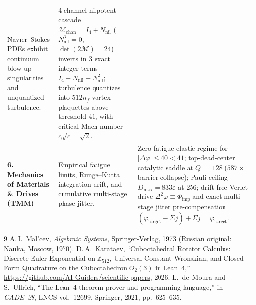\documentclass[11pt,a4paper]{article}
\theoremstyle{definition}
\theoremstyle{remark}
\begin{document}
\begin{table}[htbp]
\begin{tabular}{@{}p{}p{}p{}@{}}
Navier--Stokes PDEs exhibit continuum blow-up singularities and unquantized turbulence. &
$4$-channel nilpotent cascade $\mathcal{M}_{\mathrm{chan}} = I_4 + N_{\mathrm{nil}}$ ($N_{\mathrm{nil}}^3=0$, $\det(2\mathcal{M})=24$) inverts in 3 exact integer terms $I_4 - N_{\mathrm{nil}} + N_{\mathrm{nil}}^2$; turbulence quantizes into $512 n_f$ vortex plaquettes above threshold $41$, with critical Mach number $c_0/c=\sqrt{2}$. \\
\addlinespace[3pt]
\textbf{6. Mechanics of Materials \& Drives (TMM)} &
Empirical fatigue limits, Runge--Kutta integration drift, and cumulative multi-stage phase jitter. &
Zero-fatigue elastic regime for $|\Delta\varphi|\le 40 < 41$; top-dead-center catalytic saddle at $Q_\square=128$ ($587\times$ barrier collapse); Pauli ceiling $D_{\max}=833\varepsilon$ at $256$; drift-free Verlet drive $\Delta^2\varphi\equiv\Phi_{\mathrm{imp}}$ and exact multi-stage jitter pre-compensation $(\varphi_{\mathrm{target}}-\Sigma j)+\Sigma j = \varphi_{\mathrm{target}}$. \\
\bottomrule
\end{tabular}
\end{table}

\begin{thebibliography}{9}
A.\,I.~Mal'cev, \emph{Algebraic Systems}, Springer-Verlag, 1973 (Russian original: Nauka, Moscow, 1970).
D.\,A.~Karataev, ``Cuboctahedral Rotator Calculus: Discrete Euler Exponential on $\mathbb{Z}_{512}$, Universal Constant Wronskian, and Closed-Form Quadrature on the Cuboctahedron $O_2(3)$ in Lean~4,'' \url{https://github.com/AI-Guiders/scientific-papers}, 2026.
L.~de~Moura and S.~Ullrich, ``The Lean~4 theorem prover and programming language,'' in \emph{CADE~28}, LNCS vol.~12699, Springer, 2021, pp.~625--635.
\end{thebibliography}
\end{document}
